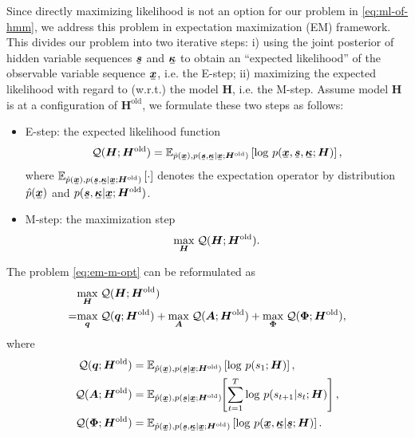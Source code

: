 \documentclass{ecai}
\newcommand{\ubar}[1]{\mkern2mu\underline{\mkern-2mu #1\mkern-2mu}\mkern2mu}
\newcommand{\ubm}[1]{\ubar{\bm{#1}}}
\begin{document}
Since directly maximizing likelihood is not an option for our problem in \eqref{eq:ml-of-hmm}, we address this problem in expectation maximization (EM) framework. This divides our problem into  two iterative steps: i) using the joint posterior of hidden variable sequences $\ubm{s}$ and $\ubm{\kappa}$ to obtain an ``expected likelihood'' of the observable variable sequence $\ubm{x}$, i.e. the E-step; ii) maximizing the expected likelihood with regard to (w.r.t.) the model $\bm{H}$, i.e. the M-step. Assume model $\bm{H}$ is at a configuration of $\bm{H}^{\mathrm{old}}$, we formulate these two steps as follows:
\begin{itemize}
\item E-step: %
  the expected likelihood function
  \begin{equation}\label{eq:em-q-funciton}
    \Qq(\bm{H}; \bm{H}^{\mathrm{old}}) = \EE_{\hat{p}(\ubm{x}),p(\ubm{s},\ubm{\kappa}| \ubm{x}; \bm{H}^{\mathrm{old}})}\left[ \log\,p(\ubm{x}, \ubm{s}, \ubm{\kappa}; \bm{H})\right],
  \end{equation}
  where $\EE_{\hat{p}(\ubm{x}),p(\ubm{s},\ubm{\kappa}| \ubm{x}; \bm{H}^{\mathrm{old}})}\left[ \cdot\right]$ denotes the expectation operator by distribution $\hat{p}(\ubm{x})$ and $p(\ubm{s},\ubm{\kappa}| \ubm{x}; \bm{H}^{\mathrm{old}})$.
\item M-step: the maximization step
  \begin{equation}\label{eq:em-m-opt}
    \underset{\bm{H}}{\max}\; \mathcal{Q}(\bm{H}; \bm{H}^{\mathrm{old}}).
  \end{equation}
\end{itemize}


The problem \eqref{eq:em-m-opt} can be reformulated as
\begin{align}\label{eq:m-step-subs}
  &\underset{\bm{H}}{\max}\; \mathcal{Q}(\bm{H}; \bm{H}^{\mathrm{old}}) \nonumber \\
  =&\underset{\bm{q}}{\max}\;\mathcal{Q}(\bm{q}; \bm{H}^{\mathrm{old}}) + \underset{\bm{A}}{\max}\;\mathcal{Q}(\bm{A}; \bm{H}^{\mathrm{old}}) 
     + \underset{\bm{\Phi}}{\max}\;\mathcal{Q}(\bm{\Phi}; \bm{H}^{\mathrm{old}}),
\end{align}
where
\begin{align}
  \Qq(\bm{q}; \bm{H}^{\mathrm{old}}) 
    &= \EE_{\hat{p}(\ubm{x}),p(\ubm{s}| \ubm{x}; \bm{H}^{\mathrm{old}})} \left[ \log\,p({s}_{1};\bm{H})  \right], \label{eq:init-distribution-update}\\
  \Qq(\bm{A}; \bm{H}^{\mathrm{old}}) &=\EE_{\hat{p}(\ubm{x}),p(\ubm{s}| \ubm{x}; \bm{H}^{\mathrm{old}})}\hspace{-0.1cm}\left[ \sum_{t=1}^{T}\log\,p({s}_{t+1}|{s}_{t}; \bm{H}) \right], \label{eq:transition-update}\\
  \Qq(\bm{\Phi}; \bm{H}^{\mathrm{old}}) &= \EE_{\hat{p}(\ubm{x}),p(\ubm{s},\ubm{\kappa}| \ubm{x}; \bm{H}^{\mathrm{old}})} \left[ \log\,p(\ubm{x}, \ubm{\kappa}| \ubm{s}; \bm{H}) \right]. \label{eq:generative-model-update}
\end{align}
\end{document}
